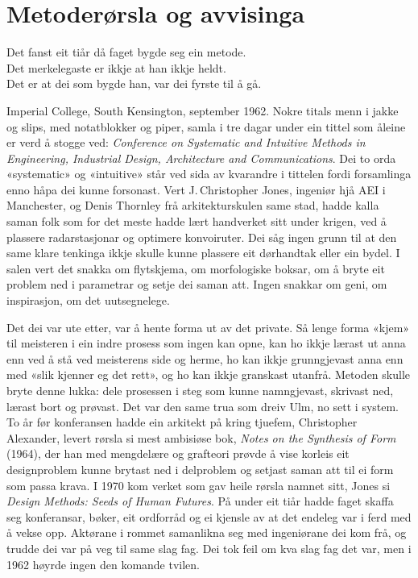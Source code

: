 \chapter{Metoderørsla og avvisinga}

\begin{motto}
Det fanst eit tiår då faget bygde seg ein metode.\\ Det merkelegaste er ikkje at han ikkje heldt.\\ Det er at dei som bygde han, var dei fyrste til å gå.
\end{motto}

Imperial College, South Kensington, september 1962. Nokre titals menn i jakke og slips, med notatblokker og piper, samla i tre dagar under ein tittel som åleine er verd å stogge ved: \textit{Conference on Systematic and Intuitive Methods in Engineering, Industrial Design, Architecture and Communications}\autocite{jones1963conference}. Dei to orda «systematic» og «intuitive» står ved sida av kvarandre i tittelen fordi forsamlinga enno håpa dei kunne forsonast. Vert J.\,Christopher Jones, ingeniør hjå AEI i Manchester, og Denis Thornley frå arkitekturskulen same stad, hadde kalla saman folk som for det meste hadde lært handverket sitt under krigen, ved å plassere radarstasjonar og optimere konvoiruter. Dei såg ingen grunn til at den same klare tenkinga ikkje skulle kunne plassere eit dørhandtak eller ein bydel. I salen vert det snakka om flytskjema, om morfologiske boksar, om å bryte eit problem ned i parametrar og setje dei saman att. Ingen snakkar om geni, om inspirasjon, om det uutsegnelege.

Det dei var ute etter, var å hente forma ut av det private. Så lenge forma «kjem» til meisteren i ein indre prosess som ingen kan opne, kan ho ikkje lærast ut anna enn ved å stå ved meisterens side og herme, ho kan ikkje grunngjevast anna enn med «slik kjenner eg det rett», og ho kan ikkje granskast utanfrå. Metoden skulle bryte denne lukka: dele prosessen i steg som kunne namngjevast, skrivast ned, lærast bort og prøvast. Det var den same trua som dreiv Ulm, no sett i system. To år før konferansen hadde ein arkitekt på kring tjuefem, Christopher Alexander, levert rørsla si mest ambisiøse bok, \textit{Notes on the Synthesis of Form} (1964), der han med mengdelære og grafteori prøvde å vise korleis eit designproblem kunne brytast ned i delproblem og setjast saman att til ei form som passa krava\autocite{alexander1964notes}. I 1970 kom verket som gav heile rørsla namnet sitt, Jones si \textit{Design Methods: Seeds of Human Futures}\autocite{jones1970methods}. På under eit tiår hadde faget skaffa seg konferansar, bøker, eit ordforråd og ei kjensle av at det endeleg var i ferd med å vekse opp. Aktørane i rommet samanlikna seg med ingeniørane dei kom frå, og trudde dei var på veg til same slag fag. Dei tok feil om kva slag fag det var, men i 1962 høyrde ingen den komande tvilen.

